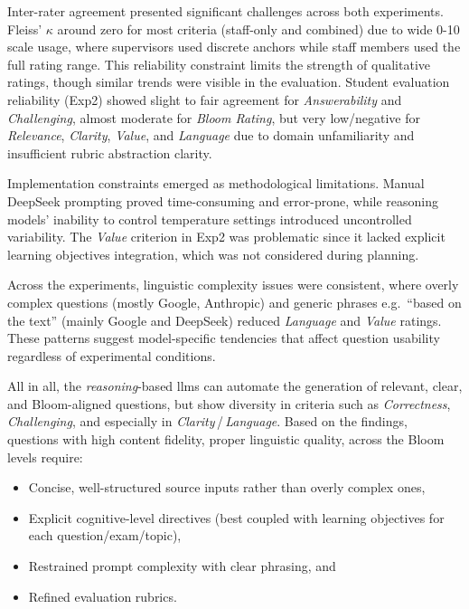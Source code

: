 Inter-rater agreement presented significant challenges across both experiments. Fleiss' $\kappa$ around zero for most criteria (staff-only and combined) due to wide 0-10 scale usage, where supervisors used discrete anchors while staff members used the full rating range. This reliability constraint limits the strength of qualitative ratings, though similar trends were visible in the evaluation. Student evaluation reliability (Exp2) showed slight to fair agreement for \textit{Answerability} and \textit{Challenging}, almost moderate for \textit{Bloom Rating}, but very low/negative for \textit{Relevance}, \textit{Clarity}, \textit{Value}, and \textit{Language} due to domain unfamiliarity and insufficient rubric abstraction clarity.

Implementation constraints emerged as methodological limitations. Manual DeepSeek prompting proved time-consuming and error-prone, while reasoning models' inability to control temperature settings introduced uncontrolled variability. The \textit{Value} criterion in Exp2 was problematic since it lacked explicit learning objectives integration, which was not considered during planning.

Across the experiments, linguistic complexity issues were consistent, where overly complex questions (mostly Google, Anthropic) and generic phrases e.g.\ \enquote{based on the text} (mainly Google and DeepSeek) reduced \textit{Language} and \textit{Value} ratings. These patterns suggest model-specific tendencies that affect question usability regardless of experimental conditions.

All in all, the \textit{reasoning}-based \acp{llm} can automate the generation of relevant, clear, and Bloom-aligned questions, but show diversity in criteria such as \textit{Correctness}, \textit{Challenging}, and especially in \textit{Clarity}\,/\,\textit{Language}. Based on the findings, questions with high content fidelity, proper linguistic quality, across the Bloom levels require:

\begin{itemize}
  \item Concise, well-structured source inputs rather than overly complex ones,
  \item Explicit cognitive-level directives (best coupled with learning objectives for each question/exam/topic),
  \item Restrained prompt complexity with clear phrasing, and
  \item Refined evaluation rubrics.
\end{itemize}

